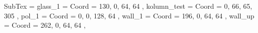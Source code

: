 SubTex = {
	glass_1								= { Coord = { 130, 0, 64, 64 } },
	kolumn_test								= { Coord = { 0, 66, 65, 305 } },
	pol_1								= { Coord = { 0, 0, 128, 64 } },
	wall_1								= { Coord = { 196, 0, 64, 64 } },
	wall_up								= { Coord = { 262, 0, 64, 64 } },
}

